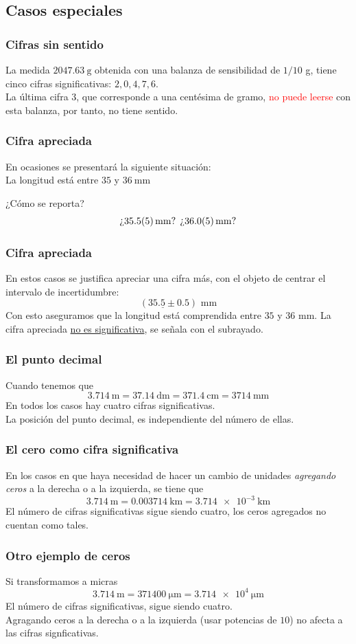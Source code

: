 \subsection*{Casos especiales}
\begin{frame}
\frametitle{Cifras sin sentido}
La medida $\SI{2047.63}{\gram}$ obtenida con una balanza de sensibilidad de $1/10$ g, tiene cinco cifras significativas: $2, 0, 4, 7, 6$.
\\
\bigskip
\pause
La última cifra $3$, que corresponde a una centésima de gramo, \textcolor{red}{no puede leerse} con esta balanza, por tanto, no tiene sentido.
\end{frame}
\begin{frame}
\frametitle{Cifra apreciada}
En ocasiones se presentará la siguiente situación:
\\
\bigskip
La longitud está entre $\num{35}$ y $\SI{36}{\mm}$
\begin{figure}
    \centering
    
\end{figure}
\pause
¿Cómo se reporta?
\[ \mbox{¿} \SI{35.5+-0.5}{\mm} \mbox{?   ¿} \SI{36+-0.5}{\mm} \mbox{?} \]
\end{frame}
\begin{frame}
\frametitle{Cifra apreciada}
En estos casos se justifica apreciar una cifra más, con el objeto de centrar el intervalo de incertidumbre:
\[ (35. \underline{5} \pm 0.5) \mbox{ mm} \]
\pause
Con esto aseguramos que la longitud está comprendida entre $35$ y $36$ mm. La cifra apreciada \underline{no es significativa}, se señala con el subrayado.
\end{frame}
\begin{frame}
\frametitle{El punto decimal}
Cuando tenemos que\[ \SI{3.714}{\meter} = \SI{37.14}{\dm} = \SI{371.4}{\cm} = \SI{3714}{\mm} \]
\pause
En todos los casos hay cuatro cifras significativas.
\\
\bigskip
\pause
La posición del punto decimal, es independiente del número de ellas.
\end{frame}
\begin{frame}
\frametitle{El cero como cifra significativa}
En los casos en que haya necesidad de hacer un cambio de unidades \emph{agregando ceros} a la derecha o a la izquierda, se tiene que
\[ \SI{3.714}{\meter} = \SI{0.003714}{\kilo\meter} = \SI{3.714e-3}{\kilo\meter} \]
\pause
El número de cifras significativas sigue siendo cuatro, los ceros agregados no cuentan como tales.
\end{frame}
\begin{frame}
\frametitle{Otro ejemplo de ceros}
Si transformamos a micras
\[ \SI{3.714}{\meter} = \SI{371400}{\micro\meter} = \SI{3.714e4}{\micro\meter}  \]
El número de cifras significativas, sigue siendo cuatro.
\\
\bigskip
\pause
Agragando ceros a la derecha o a la izquierda (usar potencias de $10$) no afecta a las cifras signficativas.
\end{frame}

